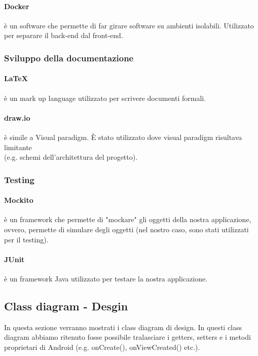 \paragraph{Docker} è un software che permette di far girare software su ambienti isolabili. Utilizzato per separare il back-end dal front-end.
\subsubsection{Sviluppo della documentazione}
\paragraph{\LaTeX} è un mark up language utilizzato per scrivere documenti formali.
\paragraph{draw.io} è simile a Visual paradigm. \`{E} stato utilizzato dove visual paradigm risultava limitante \\
(e.g. schemi dell'architettura del progetto).
\subsubsection{Testing}
\paragraph{Mockito} è un framework che permette di "mockare" gli oggetti della nostra applicazione, ovvero, permette di simulare degli oggetti (nel nostro caso, sono stati utilizzati per il testing).
\paragraph{JUnit} è un framework Java utilizzato per testare la nostra applicazione.
\newpage
\subsection{Class diagram - Desgin}
In questa sezione verranno mostrati i class diagram di design. In questi class diagram abbiamo ritenuto fosse possibile tralasciare i getters, setters e i metodi proprietari di Android (e.g. onCreate(), onViewCreated() etc.).
